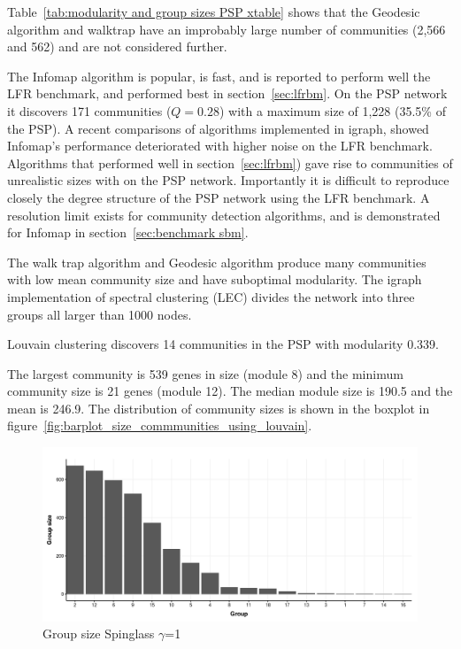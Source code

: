  Table~\ref{tab:modularity and group sizes PSP xtable} shows that the Geodesic algorithm and walktrap have an improbably large number of communities (2,566 and 562) and are not considered further. 
 
The Infomap algorithm is popular, is fast, and is reported to perform well the LFR benchmark\cite{lancichinetti2008benchmark}, \cite{newman2018networks} and performed best in section~\ref{sec:lfrbm}. On the PSP network it discovers 171 communities ($Q=0.28$) with a maximum size of 1,228 (35.5\% of the PSP). A recent comparisons of algorithms implemented in igraph\cite{yang2015defining},\cite{yang2016comparative} showed Infomap's performance deteriorated with higher noise on the LFR benchmark. Algorithms that performed well in section~\ref{sec:lfrbm}) gave rise to communities of unrealistic sizes with on the PSP network. Importantly it is difficult to reproduce closely the degree structure of the PSP network using the LFR benchmark. A resolution limit exists for community detection algorithms\cite{fortunato2016community},\cite{newman2018networks} and is demonstrated for Infomap in section~\ref{sec:benchmark sbm}.


The walk trap algorithm and Geodesic algorithm produce many communities with low mean community size and have suboptimal modularity. The igraph implementation of spectral clustering (LEC) divides the network into three groups all larger than 1000 nodes.






Louvain clustering discovers 14 communities in the PSP with modularity 0.339.

The largest community is 539 genes in size (module 8) and the minimum community size is 21 genes (module 12). The median module size is 190.5 and the mean is 246.9. The distribution of community sizes is shown in the boxplot in figure~\ref{fig:barplot_size_commmunities_using_louvain}.












\begin{figure}
    \centering
    \includegraphics[width=\textwidth]{images/chapter_community_detection/ggplot2/group_sg/Rplot_sgg1_groupsize.png}
    \caption{Group size Spinglass $\gamma$=1}
    \label{fig:spinglass_g1 groupsizes}
\end{figure}




